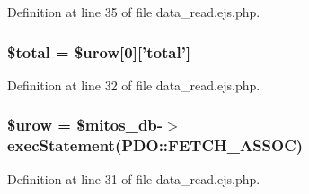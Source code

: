 \-Definition at line 35 of file data\-\_\-read.\-ejs.\-php.

\hypertarget{patientfile_2immnunization_2data__read_8ejs_8php_a241b818f48030b628685b2e5119c5624}{
\subsubsection[{\$total}]{\setlength{\rightskip}{0pt plus 5cm}\$total = \$urow\mbox{[}0\mbox{]}\mbox{[}'total'\mbox{]}}}\label{patientfile_2immnunization_2data__read_8ejs_8php_a241b818f48030b628685b2e5119c5624}


\-Definition at line 32 of file data\-\_\-read.\-ejs.\-php.

\hypertarget{patientfile_2immnunization_2data__read_8ejs_8php_ad9c2d1ef7b3320949b2590ef6ab251bd}{
\subsubsection[{\$urow}]{\setlength{\rightskip}{0pt plus 5cm}\$urow = \$mitos\-\_\-db-\/$>$exec\-Statement(\-P\-D\-O\-::\-F\-E\-T\-C\-H\-\_\-\-A\-S\-S\-O\-C)}}\label{patientfile_2immnunization_2data__read_8ejs_8php_ad9c2d1ef7b3320949b2590ef6ab251bd}


\-Definition at line 31 of file data\-\_\-read.\-ejs.\-php.

